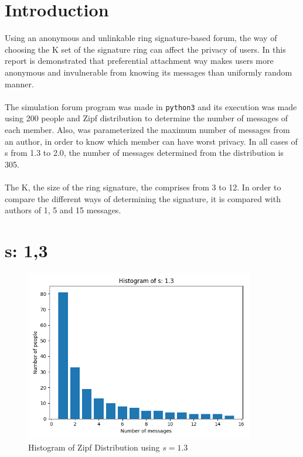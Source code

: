 \documentclass{article}
\begin{document}
\section{Introduction}
Using an anonymous and unlinkable ring signature-based forum, the way of choosing the K set of the signature ring can affect the privacy of users.
In this report is demonstrated that preferential attachment way makes users more anonymous and invulnerable from knowing its messages than uniformly random manner.\\
\\
The simulation forum program was made in \texttt{python3} and its execution was made using 200 people and Zipf distribution to determine the number of messages of each member. Also, was parameterized the maximum number of messages from an author, in order to know which member can have worst privacy. In all cases of s from 1.3 to 2.0, the number of messages determined from the distribution is 305.
\\
\\
The K, the size of the ring signature, the  comprises from 3 to 12. In order to compare the different ways of determining the signature, it is compared with authors of 1, 5 and 15 messages.
\section{s: 1,3}
\begin{figure}[H] 
	\centering
	\includegraphics[width=10cm]{imgs/histogram-13.png}
	\caption{Histogram of Zipf Distribution using $s=1.3$}
	\label{fig:hist-13}
  \end{figure}


\end{document}
